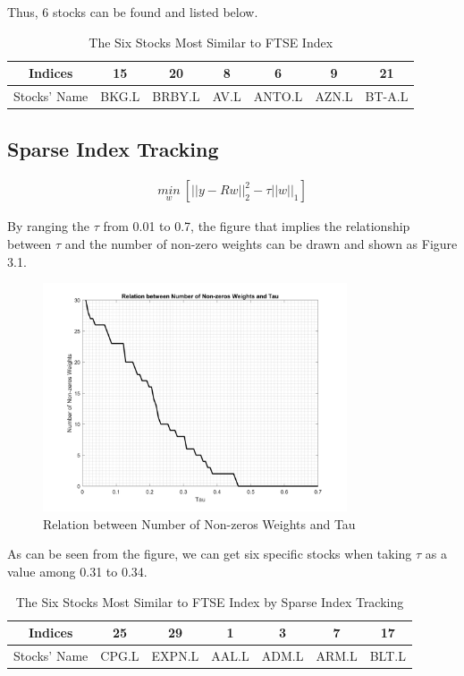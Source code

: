 \documentclass[paper=a4, fontsize=11pt]{article} %
\numberwithin{equation}{section} %
\numberwithin{figure}{section} %
\numberwithin{table}{section} %
\begin{document}
Thus, 6 stocks can be found and listed below. 

\begin{table}[h!]
	\centering
	\begin{tabular}{|c|c|c|c|c|c|c|}
		\hline
		Indices &  15 &  20 & 8 & 6 & 9 & 21 \\ 
		\hline
		Stocks' Name & BKG.L & BRBY.L & AV.L & ANTO.L & AZN.L & BT-A.L \\
		\hline
	\end{tabular}
	\caption{The Six Stocks Most Similar to FTSE Index}
\end{table}

\subsection{Sparse Index Tracking}

\begin{align}
\underset{w}{min} \ [||y-Rw||_{2}^{2}-\tau ||w||_{1}]
\end{align}

By ranging the $\tau$ from 0.01 to 0.7, the figure that implies the relationship between $\tau$ and the  number of non-zero weights can be drawn and shown as Figure 3.1.

\begin{figure}[h!]
	\centering
	\includegraphics[width=9cm]{fig6.png}
	\caption{Relation between Number of Non-zeros Weights and Tau}
\end{figure}

As can be seen from the figure, we can get six specific stocks when taking $\tau$ as a value among 0.31 to 0.34. 

\begin{table}[h!]
	\centering
	\begin{tabular}{|c|c|c|c|c|c|c|}
		\hline
		Indices &  25 &  29 & 1 & 3 & 7 & 17 \\ 
		\hline
		Stocks' Name & CPG.L & EXPN.L & AAL.L & ADM.L & ARM.L & BLT.L \\
		\hline
	\end{tabular}
	\caption{The Six Stocks Most Similar to FTSE Index by Sparse Index Tracking}
\end{table}
\end{document}
